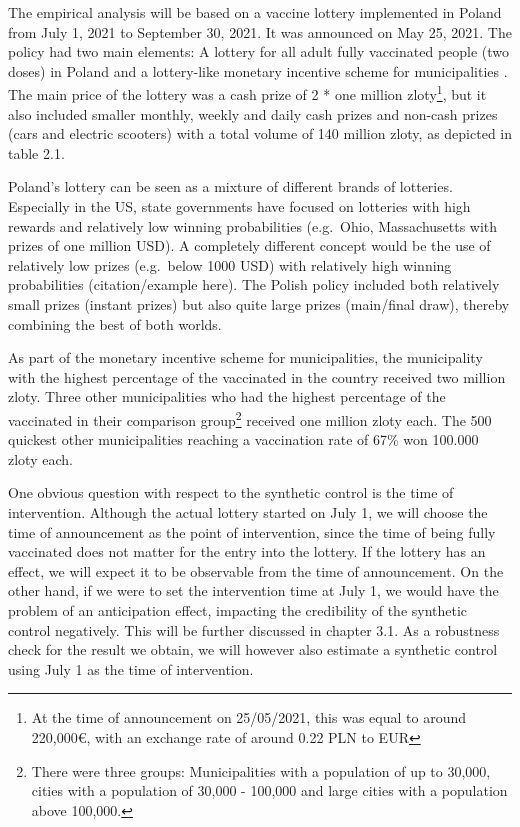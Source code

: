 \documentclass{scrbook}
\begin{document}
\renewcommand*{\arraystretch}{1}

The empirical analysis will be based on a vaccine lottery implemented in
Poland from July 1, 2021 to September 30, 2021. It was announced on May
25, 2021. The policy had two main elements: A lottery for all adult
fully vaccinated people (two doses) in Poland
\parencite{service_of_the_republic_of_poland_national_2021} and a
lottery-like monetary incentive scheme for municipalities
\parencite{service_of_the_republic_of_poland_competitions_2021}. The
main price of the lottery was a cash prize of 2 * one million
zloty\footnote{At the time of announcement on 25/05/2021, this was equal to around 220,000€, with an exchange rate of around 0.22 PLN to EUR},
but it also included smaller monthly, weekly and daily cash prizes and
non-cash prizes (cars and electric scooters) with a total volume of 140
million zloty, as depicted in table 2.1.

Poland's lottery can be seen as a mixture of different brands of
lotteries. Especially in the US, state governments have focused on
lotteries with high rewards and relatively low winning probabilities
(e.g.~Ohio, Massachusetts with prizes of one million USD). A completely
different concept would be the use of relatively low prizes (e.g.~below
1000 USD) with relatively high winning probabilities (citation/example
here). The Polish policy included both relatively small prizes (instant
prizes) but also quite large prizes (main/final draw), thereby combining
the best of both worlds.

As part of the monetary incentive scheme for municipalities, the
municipality with the highest percentage of the vaccinated in the
country received two million zloty. Three other municipalities who had
the highest percentage of the vaccinated in their comparison
group\footnote{There were three groups: Municipalities with a population of up to 30,000, cities with a population of 30,000 - 100,000 and large cities with a population above 100,000.}
received one million zloty each. The 500 quickest other municipalities
reaching a vaccination rate of 67\% won 100.000 zloty each.

One obvious question with respect to the synthetic control is the time
of intervention. Although the actual lottery started on July 1, we will
choose the time of announcement as the point of intervention, since the
time of being fully vaccinated does not matter for the entry into the
lottery. If the lottery has an effect, we will expect it to be
observable from the time of announcement. On the other hand, if we were
to set the intervention time at July 1, we would have the problem of an
anticipation effect, impacting the credibility of the synthetic control
negatively. This will be further discussed in chapter 3.1. As a
robustness check for the result we obtain, we will however also estimate
a synthetic control using July 1 as the time of intervention.
\end{document}
